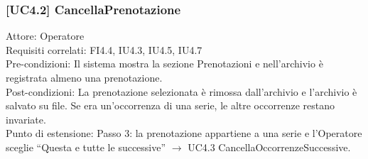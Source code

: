 \subsubsection{[UC4.2] CancellaPrenotazione}
\noindent Attore: Operatore\\
Requisiti correlati: FI4.4, IU4.3, IU4.5, IU4.7\\
Pre-condizioni: Il sistema mostra la sezione Prenotazioni e nell'archivio è registrata almeno una prenotazione.\\
Post-condizioni: La prenotazione selezionata è rimossa dall'archivio e l'archivio è salvato su file. Se era un'occorrenza di una serie, le altre occorrenze restano invariate.\\
Punto di estensione: Passo 3: la prenotazione appartiene a una serie e l'Operatore sceglie ``Questa e tutte le successive'' $\rightarrow$ UC4.3 CancellaOccorrenzeSuccessive.\\


